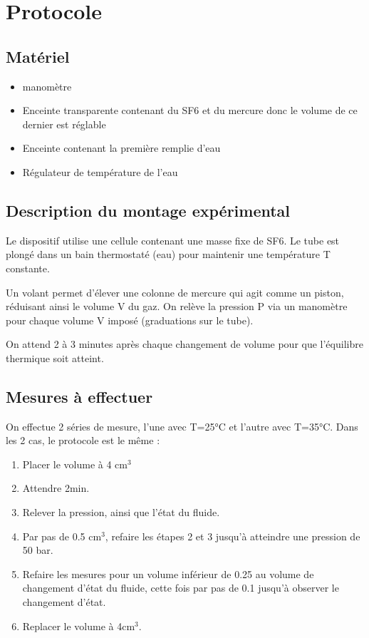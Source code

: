 \documentclass[a4paper,9pt,french]{scrartcl}
\begin{document}
   
\section{Protocole}
\subsection{Matériel}
\begin{itemize}
    \item manomètre
    \item Enceinte transparente contenant du SF6 et du mercure donc le volume de ce dernier est réglable
    \item Enceinte contenant la première remplie d'eau
    \item Régulateur de température de l'eau
\end{itemize}
\subsection{Description du montage expérimental}
Le dispositif utilise une cellule contenant une masse fixe de SF6. Le tube est plongé dans un bain thermostaté (eau) pour maintenir une température T constante.

Un volant permet d'élever une colonne de mercure qui agit comme un piston, réduisant ainsi le volume V du gaz. On relève la pression P via un manomètre pour chaque volume V imposé (graduations sur le tube).

On attend 2 à 3 minutes après chaque changement de volume pour que l'équilibre thermique soit atteint.
\begin{center}
\end{center}
\subsection{Mesures à effectuer}
On effectue 2 séries de mesure, l'une avec T=25°C et l'autre avec T=35°C. Dans les 2 cas, le protocole est le m\^eme :
\begin{enumerate}
    \item Placer le volume à 4 cm$^3$
    \item Attendre 2min.
    \item Relever la pression, ainsi que l'état du fluide.
    \item Par pas de 0.5 cm$^3$, refaire les étapes 2 et 3 jusqu'à atteindre une pression de 50 bar.
    \item Refaire les mesures pour un volume inférieur de 0.25 au volume de changement d'état du fluide, cette fois par pas de 0.1 jusqu'à observer le changement d'état. 
    \item Replacer le volume à 4cm$^3$.
\end{enumerate}
\end{document}
